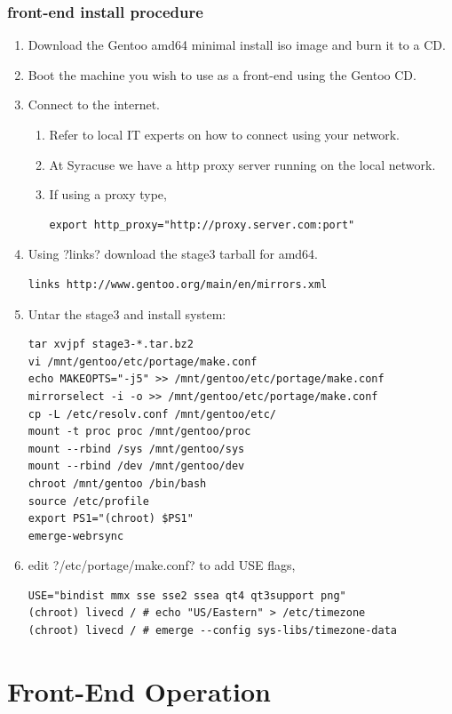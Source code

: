 \subsubsection{front-end install procedure}
\begin{enumerate}
\item Download the Gentoo amd64 minimal install iso image and burn it to a CD.
\item Boot the machine you wish to use as a front-end using the Gentoo CD.
\item Connect to the internet.
  \begin{enumerate}
  \item Refer to local IT experts on how to connect using your network.
  \item At Syracuse we have a http proxy server running on the local network.
  \item If using a proxy type,
\begin{lstlisting}
export http_proxy="http://proxy.server.com:port"
\end{lstlisting}
  \end{enumerate}
\item Using \lstin?links? download the stage3 tarball for amd64.
\begin{lstlisting}
links http://www.gentoo.org/main/en/mirrors.xml
\end{lstlisting}
\item Untar the stage3 and install system:
\begin{lstlisting}
tar xvjpf stage3-*.tar.bz2
vi /mnt/gentoo/etc/portage/make.conf
echo MAKEOPTS="-j5" >> /mnt/gentoo/etc/portage/make.conf
mirrorselect -i -o >> /mnt/gentoo/etc/portage/make.conf
cp -L /etc/resolv.conf /mnt/gentoo/etc/
mount -t proc proc /mnt/gentoo/proc
mount --rbind /sys /mnt/gentoo/sys
mount --rbind /dev /mnt/gentoo/dev
chroot /mnt/gentoo /bin/bash
source /etc/profile
export PS1="(chroot) $PS1"
emerge-webrsync
\end{lstlisting}
\item edit \lstin?/etc/portage/make.conf? to add USE flags,
\begin{lstlisting}
USE="bindist mmx sse sse2 ssea qt4 qt3support png"
(chroot) livecd / # echo "US/Eastern" > /etc/timezone
(chroot) livecd / # emerge --config sys-libs/timezone-data
\end{lstlisting}
\end{enumerate}


\section{Front-End Operation}

